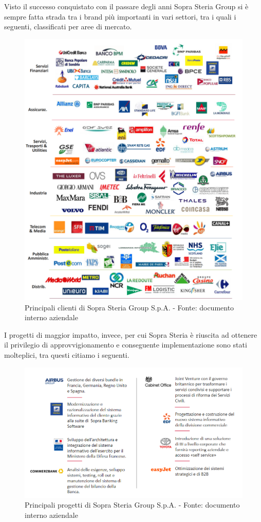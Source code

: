 	Visto il successo conquistato con il passare degli anni Sopra Steria Group si è sempre fatta strada tra i brand più importanti in vari settori, tra i quali i seguenti, classificati per aree di mercato.
	\begin{figure}[H]
	\centering
   	\includegraphics[width=1\textwidth]{immagini/principali_referenze}
   	\caption{Principali clienti di Sopra Steria Group S.p.A. - Fonte: documento interno aziendale}
	\end{figure}
\newpage
	I progetti di maggior impatto, invece, per cui Sopra Steria è riuscita ad ottenere il privilegio di approvvigionamento e conseguente implementazione sono stati molteplici, tra questi citiamo i seguenti.
	\begin{figure}[H]
	\centering
   	\includegraphics[width=1\textwidth]{immagini/Progetti_Importanti}
   	\caption{Principali progetti di Sopra Steria Group S.p.A. - Fonte: documento interno aziendale}
	\end{figure}

